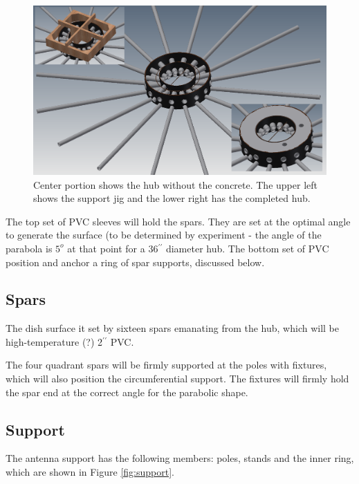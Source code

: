 \documentclass[11pt]{article}
\newcommand{\inch}{$^{\prime\prime}$}
\begin{document}
\begin{figure}[H]
\centering
\includegraphics[width=\textwidth]{plots/hub.png}
\caption{Center portion shows the hub without the concrete.  The upper left shows the support jig and the lower right has the completed hub.}
\label{fig:hub}
\end{figure}

The top set of PVC sleeves will hold the spars.  They are set at the optimal angle to generate the surface (to be determined by experiment - the angle of the parabola is $5^o$ at that point for a 36\inch{} diameter hub.  The bottom set of PVC position and anchor a ring of spar supports, discussed below.

\subsection{Spars}
The dish surface it set by sixteen spars emanating from the hub, which will be high-temperature (?) 2\inch{} PVC. 

The four quadrant spars will be firmly supported at the poles with fixtures, which will also position the circumferential support.  The fixtures will firmly hold the spar end at the correct angle for the parabolic shape.  

\subsection{Support}
The antenna support has the following members:  poles, stands and the inner ring, which are shown in Figure \ref{fig:support}.
\end{document}
